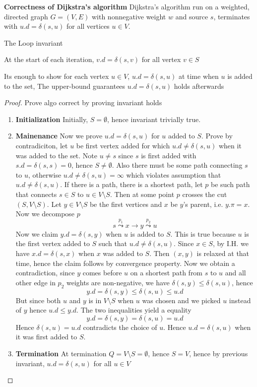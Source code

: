 \documentclass[11pt]{article}
\begin{document}
\begin{theorem*}
    \textbf{Correctness of Dijkstra's algorithm} Dijkstra's algorithm run on a weighted, directed graph $G = (V,E)$ with nonnegative weight $w$ and source $s$, terminates with $u.d = \delta(s,u)$ for all vertices $u\in V$.
\end{theorem*}

\begin{proposition*}
    The Loop invariant
    \begin{center}
        At the start of each iteration, $v.d = \delta(s,v)$ for all vertex $v\in S$
    \end{center}
    Its enough to show for each vertex $u\in V$, $u.d =\delta(s,u)$ at time when $u$ is added to the set, The upper-bound guarantees $u.d = \delta(s,u)$ holds afterwards
    \begin{proof}
    Prove algo correct by proving invariant holds 
    \begin{enumerate}
        \item \textbf{Initialization} Initially, $S = \emptyset$, hence invariant trivially true.
        \item \textbf{Mainenance}  Now we prove $u.d = \delta(s,u)$ for $u$ added to $S$. Prove by contradiciton, let $u$ be first vertex added for which $u.d \neq \delta(s,u)$ when it was added to the set. Note $u \neq s$ since $s$ is first added with $s.d = \delta(s,s) = 0$, hence $S\neq \emptyset$. Also there must be some path connecting $s$ to $u$, otherwise $u.d \neq \delta(s,u) = \infty$ which violates assumption that $u.d \neq \delta(s,u)$. If there is a path, there is a shortest path, let $p$ be such path that connects $s\in S$ to $u\in V\setminus S$. Then at some point $p$ crosses the cut $(S, V\setminus S)$. Let $y \in V\setminus S$ be the first vertices and $x$ be $y$'s parent, i.e. $y.\pi = x$. Now we decompose $p$ 
        \[
            s \overset{p_1}{\leadsto} x \to y \overset{p_2}{\leadsto} u
        \]
        Now we claim $y.d = \delta(s,y)$ when $u$ is added to $S$. This is true because $u$ is the first vertex added to $S$ such that $u.d\neq \delta(s,u)$. Since $x\in S$, by I.H. we have $x.d = \delta(s,x)$ when $x$ was added to $S$. Then $(x,y)$ is relaxed at that time, hence the claim follows by convergence property. Now we obtain a contradiction, since $y$ comes before $u$ on a shortest path from $s$ to $u$ and all other edge in $p_2$ weights are non-negative, we have $\delta(s,y) \leq \delta(s,u)$, hence 
        \[
            y.d = \delta(s, y) \leq \delta(s,u) \leq u.d
        \]
        But since both $u$ and $y$ is in $V\setminus S$ when $u$ was chosen and we picked $u$ instead of $y$ hence $u.d \leq y.d$. The two inequalities yield a equality 
        \[
            y.d = \delta(s,y) = \delta(s,u) = u.d
        \]
        Hence $\delta(s, u) = u.d$ contradicts the choice of $u$. Hence $u.d = \delta(s,u)$ when it was first added to $S$. 
        \item \textbf{Termination} At termination $Q = V\setminus S = \emptyset$, hence $S = V$, hence by previous invariant, $u.d = \delta(s,u)$ for all $u\in V$
    \end{enumerate}
    \end{proof}
\end{proposition*}
\end{document}
